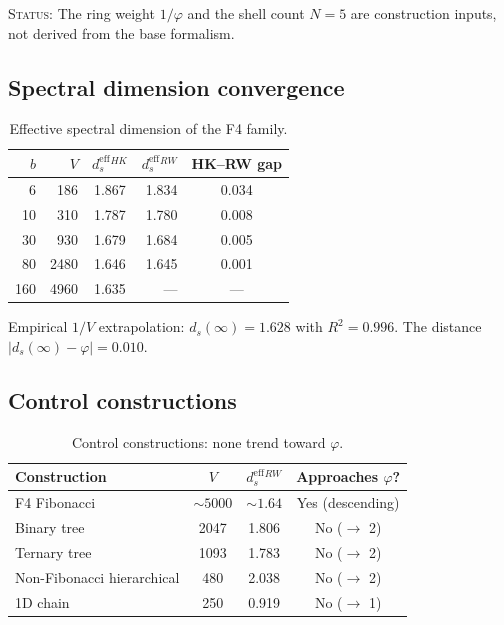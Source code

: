 \documentclass[12pt]{article}
\newcommand{\phig}{\varphi}
\newcommand{\ds}{d_s}
\newcommand{\dseff}{d_s^{\mathrm{eff}}}
\begin{document}
\textsc{Status:} The ring weight $1/\phig$ and the shell count $N = 5$ are construction inputs, not derived from the base formalism.

\subsection{Spectral dimension convergence}

\begin{table}[ht]
\centering
\caption{Effective spectral dimension of the F4 family.}
\label{tab:F4}
\begin{tabular}{@{}rrcrc@{}}
\toprule
$b$ & $V$ & $\dseff^{HK}$ & $\dseff^{RW}$ & HK--RW gap \\
\midrule
6 & 186 & 1.867 & 1.834 & 0.034 \\
10 & 310 & 1.787 & 1.780 & 0.008 \\
30 & 930 & 1.679 & 1.684 & 0.005 \\
80 & 2480 & 1.646 & 1.645 & 0.001 \\
160 & 4960 & 1.635 & --- & --- \\
\bottomrule
\end{tabular}
\end{table}

Empirical $1/V$ extrapolation: $\ds(\infty) = 1.628$ with $R^2 = 0.996$. The distance $|\ds(\infty) - \phig| = 0.010$.

\subsection{Control constructions}

\begin{table}[ht]
\centering
\caption{Control constructions: none trend toward $\phig$.}
\label{tab:controls}
\begin{tabular}{@{}lccc@{}}
\toprule
Construction & $V$ & $\dseff^{RW}$ & Approaches $\phig$? \\
\midrule
F4 Fibonacci & $\sim\!5000$ & $\sim\!1.64$ & Yes (descending) \\
Binary tree & 2047 & 1.806 & No ($\to$ 2) \\
Ternary tree & 1093 & 1.783 & No ($\to$ 2) \\
Non-Fibonacci hierarchical & 480 & 2.038 & No ($\to$ 2) \\
1D chain & 250 & 0.919 & No ($\to$ 1) \\
\bottomrule
\end{tabular}
\end{table}
\end{document}
